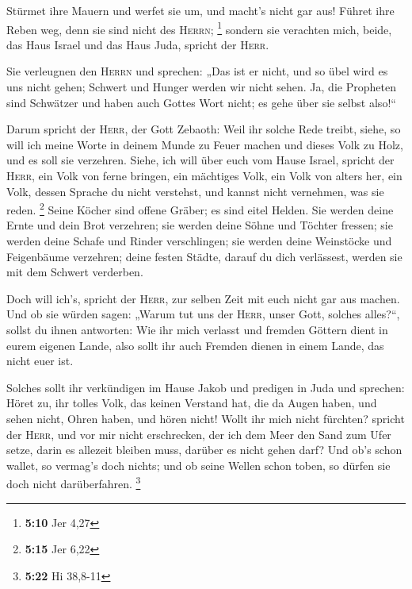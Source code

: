  Stürmet ihre Mauern und werfet sie um, und macht's nicht
gar aus! Führet ihre Reben weg, denn sie sind nicht des \textsc{Herrn};
\footnote{\textbf{5:10} Jer 4,27}  sondern sie verachten
mich, beide, das Haus Israel und das Haus Juda, spricht der
\textsc{Herr}.

 Sie verleugnen den \textsc{Herrn} und sprechen: „Das ist
er nicht, und so übel wird es uns nicht gehen; Schwert und Hunger werden
wir nicht sehen.  Ja, die Propheten sind Schwätzer und
haben auch Gottes Wort nicht; es gehe über sie selbst also!{}``

 Darum spricht der \textsc{Herr}, der Gott Zebaoth: Weil
ihr solche Rede treibt, siehe, so will ich meine Worte in deinem Munde
zu Feuer machen und dieses Volk zu Holz, und es soll sie verzehren.
 Siehe, ich will über euch vom Hause Israel, spricht der
\textsc{Herr}, ein Volk von ferne bringen, ein mächtiges Volk, ein Volk
von alters her, ein Volk, dessen Sprache du nicht verstehst, und kannst
nicht vernehmen, was sie reden. \footnote{\textbf{5:15} Jer 6,22}
 Seine Köcher sind offene Gräber; es sind eitel Helden.
 Sie werden deine Ernte und dein Brot verzehren; sie
werden deine Söhne und Töchter fressen; sie werden deine Schafe und
Rinder verschlingen; sie werden deine Weinstöcke und Feigenbäume
verzehren; deine festen Städte, darauf du dich verlässest, werden sie
mit dem Schwert verderben.

 Doch will ich's, spricht der \textsc{Herr}, zur selben
Zeit mit euch nicht gar aus machen.  Und ob sie würden
sagen: „Warum tut uns der \textsc{Herr}, unser Gott, solches alles?{}``,
sollst du ihnen antworten: Wie ihr mich verlasst und fremden Göttern
dient in eurem eigenen Lande, also sollt ihr auch Fremden dienen in
einem Lande, das nicht euer ist.

 Solches sollt ihr verkündigen im Hause Jakob und
predigen in Juda und sprechen:  Höret zu, ihr tolles
Volk, das keinen Verstand hat, die da Augen haben, und sehen nicht,
Ohren haben, und hören nicht!  Wollt ihr mich nicht
fürchten? spricht der \textsc{Herr}, und vor mir nicht erschrecken, der
ich dem Meer den Sand zum Ufer setze, darin es allezeit bleiben muss,
darüber es nicht gehen darf? Und ob's schon wallet, so vermag's doch
nichts; und ob seine Wellen schon toben, so dürfen sie doch nicht
darüberfahren. \footnote{\textbf{5:22} Hi 38,8-11}

